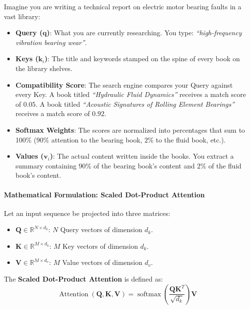 \begin{analogy}
Imagine you are writing a technical report on electric motor bearing faults in a vast library:
\begin{itemize}
    \item \textbf{Query ($\mathbf{q}$)}: What you are currently researching. You type: \emph{``high-frequency vibration bearing wear''}.
    \item \textbf{Keys ($\mathbf{k}_i$)}: The title and keywords stamped on the spine of every book on the library shelves.
    \item \textbf{Compatibility Score}: The search engine compares your Query against every Key. A book titled \emph{``Hydraulic Fluid Dynamics''} receives a match score of $0.05$. A book titled \emph{``Acoustic Signatures of Rolling Element Bearings''} receives a match score of $0.92$.
    \item \textbf{Softmax Weights}: The scores are normalized into percentages that sum to 100\% ($90\%$ attention to the bearing book, $2\%$ to the fluid book, etc.).
    \item \textbf{Values ($\mathbf{v}_i$)}: The actual content written inside the books. You extract a summary containing $90\%$ of the bearing book's content and $2\%$ of the fluid book's content.
\end{itemize}
\end{analogy}

\paragraph{Mathematical Formulation: Scaled Dot-Product Attention}
Let an input sequence be projected into three matrices:
\begin{itemize}
    \item $\mathbf{Q} \in \mathbb{R}^{N \times d_k}$: $N$ Query vectors of dimension $d_k$.
    \item $\mathbf{K} \in \mathbb{R}^{M \times d_k}$: $M$ Key vectors of dimension $d_k$.
    \item $\mathbf{V} \in \mathbb{R}^{M \times d_v}$: $M$ Value vectors of dimension $d_v$.
\end{itemize}
The \textbf{Scaled Dot-Product Attention} is defined as:
\begin{equation}
\operatorname{Attention}(\mathbf{Q}, \mathbf{K}, \mathbf{V}) = \operatorname{softmax}\left(\frac{\mathbf{Q}\mathbf{K}^T}{\sqrt{d_k}}\right)\mathbf{V}\label{eq:scaled_dot_attention}
\end{equation}

